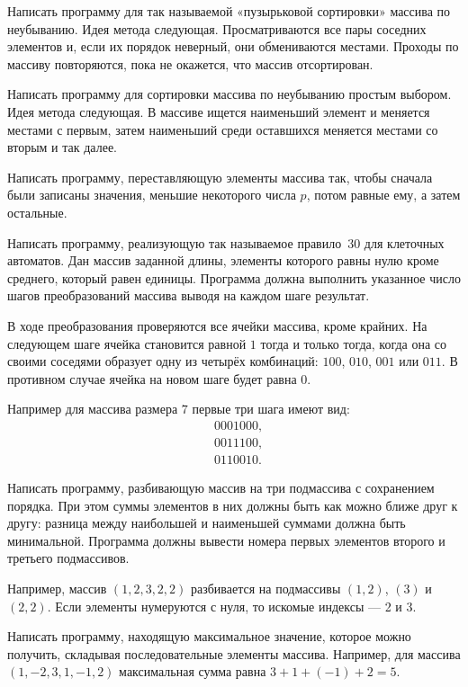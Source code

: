 \task Написать программу для так называемой «пузырьковой сортировки»
массива по неубыванию. Идея метода следующая. Просматриваются все пары
соседних элементов и, если их порядок неверный, они обмениваются
местами. Проходы по массиву повторяются, пока не окажется, что массив
отсортирован.

\task Написать программу для сортировки массива по неубыванию простым
выбором. Идея метода следующая. В массиве ищется наименьший элемент и
меняется местами с первым, затем наименьший среди оставшихся меняется
местами со вторым и так далее.

\task Написать программу, переставляющую элементы массива так, чтобы
сначала были записаны значения, меньшие некоторого числа $p$, потом
равные ему, а затем остальные.

\task Написать программу, реализующую так называемое правило~30 для
клеточных автоматов. Дан массив заданной длины, элементы которого
равны нулю кроме среднего, который равен единицы. Программа должна
выполнить указанное число шагов преобразований массива выводя на
каждом шаге результат.

В ходе преобразования проверяются все ячейки массива, кроме
крайних. На следующем шаге ячейка становится равной $1$ тогда и только
тогда, когда она со своими соседями образует одну из четырёх
комбинаций: $100$, $010$, $001$ или $011$. В противном случае ячейка
на новом шаге будет равна $0$.

Например для массива размера $7$ первые три шага имеют вид:
\begin{eqnarray*}
&0001000,\\
&0011100,\\
&0110010.
\end{eqnarray*}

\task Написать программу, разбивающую массив на три подмассива с
сохранением порядка. При этом суммы элементов в них должны быть как
можно ближе друг к другу: разница между наибольшей и наименьшей
суммами должна быть минимальной. Программа должны вывести номера
первых элементов второго и третьего подмассивов.

Например, массив $(1, 2, 3, 2, 2)$ разбивается на подмассивы $(1, 2)$,
$(3)$ и $(2, 2).$ Если элементы нумеруются с нуля, то искомые индексы
— 2 и 3.

\task Написать программу, находящую максимальное значение, которое
можно получить, складывая последовательные элементы массива. Например,
для массива $(1, -2, 3, 1, -1, 2)$ максимальная сумма равна
$3+1+(-1)+2=5$.

